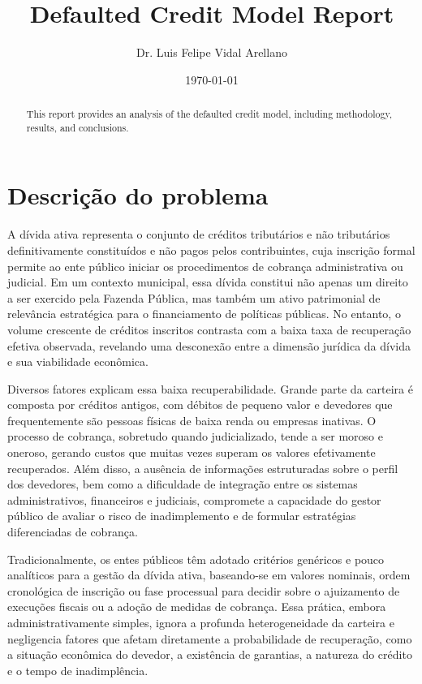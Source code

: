 \documentclass[a4paper,12pt]{article}
\begin{document}
\title{Defaulted Credit Model Report}
\author{Dr. Luis Felipe Vidal Arellano}
\date{\today}
\maketitle

\begin{abstract}
This report provides an analysis of the defaulted credit model, including methodology, results, and conclusions.
\end{abstract}

\tableofcontents
\newpage

\section{Descrição do problema}
A dívida ativa representa o conjunto de créditos tributários e não tributários definitivamente constituídos e não pagos pelos contribuintes, cuja inscrição formal permite ao ente público iniciar os procedimentos de cobrança administrativa ou judicial. Em um contexto municipal, essa dívida constitui não apenas um direito a ser exercido pela Fazenda Pública, mas também um ativo patrimonial de relevância estratégica para o financiamento de políticas públicas. No entanto, o volume crescente de créditos inscritos contrasta com a baixa taxa de recuperação efetiva observada, revelando uma desconexão entre a dimensão jurídica da dívida e sua viabilidade econômica.

Diversos fatores explicam essa baixa recuperabilidade. Grande parte da carteira é composta por créditos antigos, com débitos de pequeno valor e devedores que frequentemente são pessoas físicas de baixa renda ou empresas inativas. O processo de cobrança, sobretudo quando judicializado, tende a ser moroso e oneroso, gerando custos que muitas vezes superam os valores efetivamente recuperados. Além disso, a ausência de informações estruturadas sobre o perfil dos devedores, bem como a dificuldade de integração entre os sistemas administrativos, financeiros e judiciais, compromete a capacidade do gestor público de avaliar o risco de inadimplemento e de formular estratégias diferenciadas de cobrança.

Tradicionalmente, os entes públicos têm adotado critérios genéricos e pouco analíticos para a gestão da dívida ativa, baseando-se em valores nominais, ordem cronológica de inscrição ou fase processual para decidir sobre o ajuizamento de execuções fiscais ou a adoção de medidas de cobrança. Essa prática, embora administrativamente simples, ignora a profunda heterogeneidade da carteira e negligencia fatores que afetam diretamente a probabilidade de recuperação, como a situação econômica do devedor, a existência de garantias, a natureza do crédito e o tempo de inadimplência.
\end{document}
